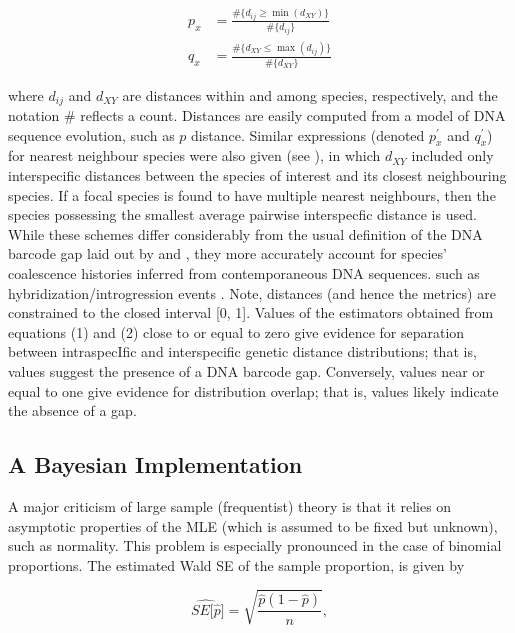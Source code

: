 \documentclass[12pt]{article}
\begin{document}
\begin{align}
p_x &= \frac{\#\{d_{ij} \geq \min(d_{XY})\}}{\#\{d_{ij}\}} \\[1mm]
q_x &= \frac{\#\{d_{XY} \leq \max(d_{ij})\}}{\#\{d_{XY}\}}
\end{align}

\noindent where $d_{ij}$ and $d_{XY}$ are distances within and among species, respectively, and the notation \# reflects a count. Distances are easily computed from a model of DNA sequence evolution, such as $p$ distance. Similar expressions (denoted $p^{'}_x$ and $q^{'}_x$) for nearest neighbour species were also given (see \cite{phillips2024measure}), in which $d_{XY}$ included only interspecific distances between the species of interest and its closest neighbouring species. If a focal species is found to have multiple nearest neighbours, then the species possessing the smallest average pairwise interspecfic distance is used. While these schemes differ considerably from the usual definition of the DNA barcode gap laid out by \citet{meyer2005dna} and \citet{meier2008use}, they more accurately account for species' coalescence histories inferred from contemporaneous DNA sequences. such as hybridization/introgression events \citep{phillips2024measure}. Note, distances (and hence the metrics) are constrained to the closed interval [0, 1]. Values of the estimators obtained from equations (1) and (2) close to or equal to zero give evidence for separation between intraspecIfic and interspecific genetic distance distributions; that is, values suggest the presence of a DNA barcode gap. Conversely, values near or equal to one give evidence for distribution overlap; that is, values likely indicate the absence of a gap.



\subsection{A Bayesian Implementation}

A major criticism of large sample (frequentist) theory is that it relies on asymptotic properties of the MLE (which is assumed to be fixed but unknown), such as normality. This problem is especially pronounced in the case of binomial proportions. The estimated Wald SE of the sample proportion, is given by 

\begin{equation}
\widehat{SE[\hat{p}}] = \sqrt{\frac{\hat{p}(1 - \hat{p})}{n}},
\end{equation}
\end{document}
